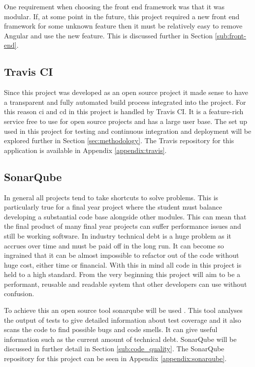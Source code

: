 One requirement when choosing the front end framework was that it was modular. If, at some point in the future, this project required a new front end framework for some unknown feature then it must be relatively easy to remove Angular and use the new feature. This is discussed further in Section \ref{sub:front-end}.

\subsection{Travis CI}
Since this project was developed as an open source project it made sense to have a transparent and fully automated build process integrated into the project. For this reason \gls{ci} and \gls{cd} in this project is handled by \gls{Travis} CI. It is a feature-rich service free to use for open source projects and has a large user base. The set up used in this project for testing and continuous integration and deployment will be explored further in Section \ref{sec:methodology}. The Travis repository for this application is available in Appendix \ref{appendix:travis}.

\subsection{SonarQube}
\label{sub:sonarqube-technologies}
In general all projects tend to take shortcuts to solve problems. This is particularly true for a final year project where the student must balance developing a substantial code base alongside other modules. This can mean that the final product of many final year projects can suffer performance issues and still be working software. In industry \gls{technical debt} is a huge problem as it accrues over time and must be paid off in the long run. It can become so ingrained that it can be almost impossible to refactor out of the code without huge cost, either time or financial. With this in mind all code in this project is held to a high standard. From the very beginning this project will aim to be a performant, reusable and readable system that other developers can use without confusion.

To achieve this an open source tool \gls{sonarqube} will be used \citep{Sonar2016}. This tool analyses the output of tests to give detailed information about test coverage and it also scans the code to find possible bugs and \gls{code smell}s. It can give useful information such as the current amount of \gls{technical debt}. SonarQube will be discussed in further detail in Section \ref{sub:code_quality}. The SonarQube repository for this project can be seen in Appendix \ref{appendix:sonarqube}.

